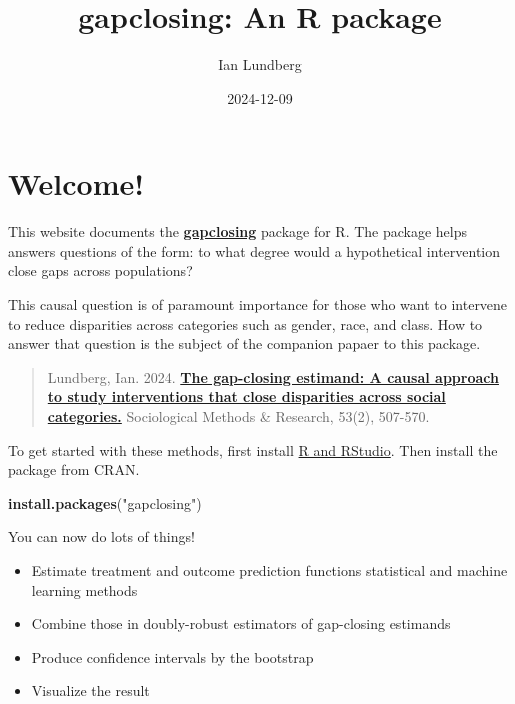 \documentclass[
]{article}
\title{gapclosing: An R package}
\author{Ian Lundberg}
\date{2024-12-09}
\newenvironment{Shaded}{\begin{snugshade}}{\end{snugshade}}
\newcommand{\FunctionTok}[1]{\textcolor[rgb]{0.13,0.29,0.53}{\textbf{#1}}}
\newcommand{\NormalTok}[1]{#1}
\newcommand{\StringTok}[1]{\textcolor[rgb]{0.31,0.60,0.02}{#1}}
\providecommand{\tightlist}{%
  \setlength{\itemsep}{0pt}\setlength{\parskip}{0pt}}
\begin{document}
\maketitle

{
\setcounter{tocdepth}{2}
\tableofcontents
}
\section*{Welcome!}\label{welcome}

This website documents the \href{https://cran.r-project.org/web/packages/gapclosing/}{\textbf{gapclosing}} package for R. The package helps answers questions of the form: to what degree would a hypothetical intervention close gaps across populations?

This causal question is of paramount importance for those who want to intervene to reduce disparities across categories such as gender, race, and class. How to answer that question is the subject of the companion papaer to this package.

\begin{quote}
Lundberg, Ian. 2024. \href{https://doi.org/10.1177/00491241211055769}{\textbf{The gap-closing estimand: A causal approach to study interventions that close disparities across social categories.}} Sociological Methods \& Research, 53(2), 507-570.
\end{quote}

To get started with these methods, first install \href{https://rstudio-education.github.io/hopr/starting.html}{R and RStudio}. Then install the package from CRAN.

\begin{Shaded}
\begin{Highlighting}[]
\FunctionTok{install.packages}\NormalTok{(}\StringTok{"gapclosing"}\NormalTok{)}
\end{Highlighting}
\end{Shaded}

You can now do lots of things!

\begin{itemize}
\tightlist
\item
  Estimate treatment and outcome prediction functions statistical and machine learning methods
\item
  Combine those in doubly-robust estimators of gap-closing estimands
\item
  Produce confidence intervals by the bootstrap
\item
  Visualize the result
\end{itemize}
\end{document}
